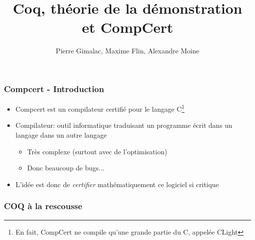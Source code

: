 \documentclass[11pt,a4paper]{beamer}
\title{Coq, théorie de la démonstration et CompCert}
\author{Pierre Gimalac, Maxime Flin, Alexandre Moine}
\begin{document}
\maketitle

\begin{frame}
\frametitle{Compcert - Introduction}
\begin{itemize}
\item Compcert est un compilateur certifié pour le langage C\footnote{En fait, CompCert ne compile qu'une grande partie du C, appelée CLight}
\item Compilateur: outil informatique traduisant un programme écrit dans un langage dans un autre langage
\begin{itemize}
	\item Très complexe (surtout avec de l'optimisation)
	\item Donc beaucoup de bugs...
\end{itemize}
\item L'idée est donc de \emph{certifier} mathématiquement ce logiciel si critique
\end{itemize}
\end{frame}

\begin{frame}
\frametitle{COQ à la rescousse}
\end{frame}
\end{document}
